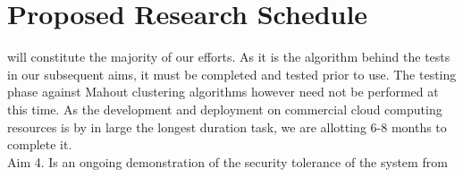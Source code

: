 \documentclass[a4paper,10pt]{article}
\begin{document}
\section{Proposed Research Schedule}  
will constitute the majority of our efforts.  As it is the algorithm
behind the tests in our subsequent aims, it must be completed and tested prior
to use.  The testing phase against Mahout clustering algorithms however need not
be performed at this time. As the development and deployment  on commercial
cloud computing resources is by in large the longest duration task, we are
allotting 6-8 months to complete it.\\ 
Aim 4. Is an ongoing demonstration of the security tolerance of the system from



 \markright{ }
\end{document}
